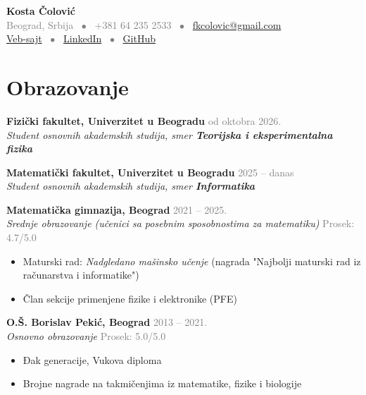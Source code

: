 \documentclass[10pt, letterpaper]{article}
\newcommand{\entry}[4]{
  \vspace{1.5ex}
  \noindent\textbf{#1} \hfill \textcolor{graytext}{\small #2} \\
  \noindent\textit{#3} \hfill \textcolor{graytext}{\small #4}
  \vspace{0.5ex}
}
\begin{document}
\begin{center}
    {\Huge \bfseries \color{primary} Kosta Čolović} \\[1.5ex]
    \textcolor{graytext}{
        Beograd, Srbija \ $\bullet$ \ 
        +381 64 235 2533 \ $\bullet$ \ 
        \href{mailto:fkcolovic@gmail.com}{fkcolovic@gmail.com}
    } \\[0.8ex]
    \textcolor{graytext}{
        \href{https://kostaco.github.io}{Veb-sajt} \ $\bullet$ \ 
        \href{https://www.linkedin.com/in/kosta-\%C4\%8Dolovi\%C4\%87}{LinkedIn} \ $\bullet$ \ 
        \href{https://github.com/kostaco}{GitHub}
    }
\end{center}

\vspace{2ex}

\section*{Obrazovanje}
\entry{Fizički fakultet, Univerzitet u Beogradu}{od oktobra 2026.}{Student osnovnih akademskih studija, smer \textbf{Teorijska i eksperimentalna fizika}}{}

\entry{Matematički fakultet, Univerzitet u Beogradu}{2025 -- danas}{Student osnovnih akademskih studija, smer \textbf{Informatika}}{}

\entry{Matematička gimnazija, Beograd}{2021 -- 2025.}{Srednje obrazovanje (učenici sa posebnim sposobnostima za matematiku)}{Prosek: 4.7/5.0}
\begin{itemize}[leftmargin=1.5em, topsep=0.2ex, itemsep=0.2ex]
    \item Maturski rad: \textit{Nadgledano mašinsko učenje} (nagrada "Najbolji maturski rad iz računarstva i informatike")
    \item Član sekcije primenjene fizike i elektronike (PFE)
\end{itemize}

\entry{O.Š. Borislav Pekić, Beograd}{2013 -- 2021.}{Osnovno obrazovanje}{Prosek: 5.0/5.0}
\begin{itemize}[leftmargin=1.5em, topsep=0.2ex, itemsep=0.2ex]
    \item Đak generacije, Vukova diploma
    \item Brojne nagrade na takmičenjima iz matematike, fizike i biologije
\end{itemize}

\vspace{1ex}
\end{document}
